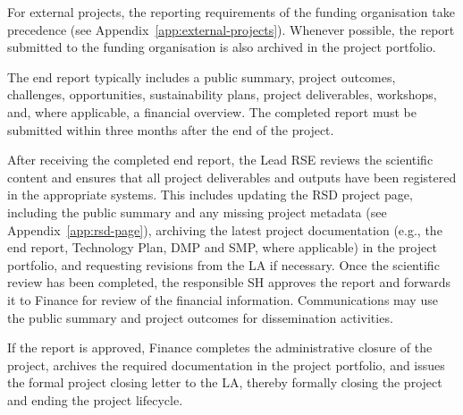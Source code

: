For external projects, the reporting requirements of the funding organisation take precedence 
(see Appendix~\ref{app:external-projects}). Whenever possible, the report submitted to the funding organisation is 
also archived in the project portfolio.

The end report typically includes a public summary, project outcomes, challenges, opportunities, sustainability plans, 
project deliverables, workshops, and, where applicable, a financial overview. The completed report must be submitted 
within three months after the end of the project. 

After receiving the completed end report, the Lead RSE reviews the scientific content and ensures that all project 
deliverables and outputs have been registered in the appropriate systems. This includes updating the RSD project page, 
including the public summary and any missing project metadata (see Appendix~\ref{app:rsd-page}), archiving the latest 
project documentation (e.g., the end report, Technology Plan, DMP and SMP, where applicable) in the project portfolio, 
and requesting revisions from the LA if necessary. Once the scientific review has been completed, the responsible SH 
approves the report and forwards it to Finance for review of the financial information. Communications may use the 
public summary and project outcomes for dissemination activities.

If the report is approved, Finance completes the administrative closure of the project, archives the required 
documentation in the project portfolio, and issues the formal project closing letter to the LA, thereby formally 
closing the project and ending the project lifecycle.